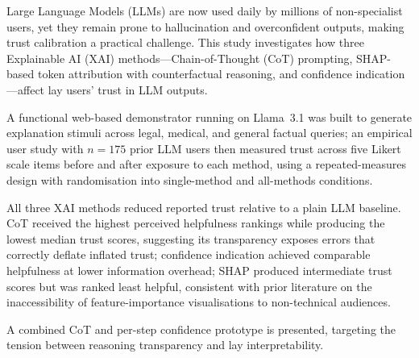 Large Language Models (LLMs) are now used daily by millions of non-specialist users, yet they remain prone to hallucination and overconfident outputs, making trust calibration a practical challenge. This study investigates how three Explainable AI (XAI) methods—Chain-of-Thought (CoT) prompting, SHAP-based token attribution with counterfactual reasoning, and confidence indication—affect lay users' trust in LLM outputs. 

A functional web-based demonstrator running on Llama~3.1 was built to generate explanation stimuli across legal, medical, and general factual queries; an empirical user study with $n = 175$ prior LLM users then measured trust across five Likert scale items before and after exposure to each method, using a repeated-measures design with randomisation into single-method and all-methods conditions. 

All three XAI methods reduced reported trust relative to a plain LLM baseline. CoT received the highest perceived helpfulness rankings while producing the lowest median trust scores, suggesting its transparency exposes errors that correctly deflate inflated trust; confidence indication achieved comparable helpfulness at lower information overhead; SHAP produced intermediate trust scores but was ranked least helpful, consistent with prior literature on the inaccessibility of feature-importance visualisations to non-technical audiences. 

A combined CoT and per-step confidence prototype is presented, targeting the tension between reasoning transparency and lay interpretability.